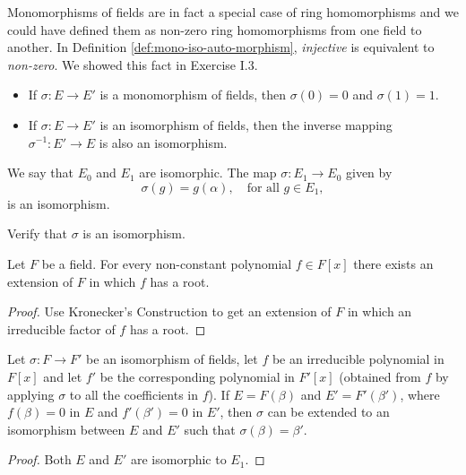 \begin{note}
	Monomorphisms of fields are in fact a special case of ring homomorphisms and we could have defined them as non-zero ring homomorphisms from one field to another. In Definition \ref{def:mono-iso-auto-morphism}, \emph{injective} is equivalent to \emph{non-zero}. We showed this fact in Exercise I.3.
\end{note}

\begin{exercises}[Easy]\hfill
	\begin{itemize}
		\item If $\sigma : E \to E'$ is a monomorphism of fields, then $\sigma(0) = 0$ and $\sigma(1) = 1$.
		\item If $\sigma : E \to E'$ is an isomorphism of fields, then the inverse mapping $\sigma^{-1} : E' \to E$ is also an isomorphism.
	\end{itemize}
\end{exercises}

We say that $E_0$ and $E_1$ are isomorphic. The map $\sigma : E_1 \to E_0$ given by
\[
	\sigma(g) = g(\alpha), \quad \text{for all } g \in E_1,
\]
is an isomorphism.

\begin{exercise}[Useful]
	Verify that $\sigma$ is an isomorphism.
\end{exercise}

\begin{theorem}[L. Kronecker]
	Let $F$ be a field. For every non-constant polynomial $f \in F[x]$ there exists an extension of $F$ in which $f$ has a root.
	\begin{proof}
		Use Kronecker's Construction to get an extension of $F$ in which an irreducible factor of $f$ has a root.
	\end{proof}
\end{theorem}

\begin{theorem}\label{thm:8}
	Let $\sigma : F \to F'$ be an isomorphism of fields, let $f$ be an irreducible polynomial in $F[x]$ and let $f'$ be the corresponding polynomial in $F'[x]$ (obtained from $f$ by applying $\sigma$ to all the coefficients in $f$). If $E = F(\beta)$ and $E' = F'(\beta')$, where $f(\beta) = 0$ in $E$ and $f'(\beta') = 0$ in $E'$, then $\sigma$ can be extended to an isomorphism between $E$ and $E'$ such that $\sigma(\beta) = \beta'$.
	
	\begin{center}
		\def\svgwidth{0.5\columnwidth}
	\end{center}
		
	\begin{proof}
		Both $E$ and $E'$ are isomorphic to $E_1$.
	\end{proof}
\end{theorem}


